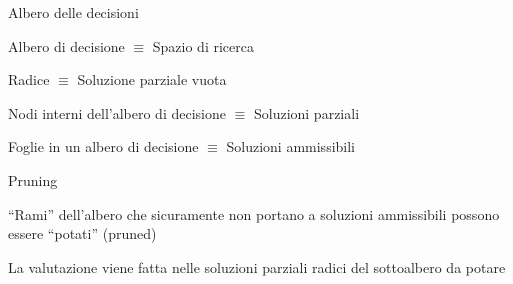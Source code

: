 \begin{frame}{Albero delle decisioni}

\BI
\item \alert{Albero di decisione} $\equiv$ Spazio di ricerca
\item \alert{Radice} $\equiv$ Soluzione parziale vuota
\item \alert{Nodi interni dell'albero di decisione} $\equiv$ Soluzioni parziali  
\item \alert{Foglie in un albero di decisione} $\equiv$ Soluzioni ammissibili 
\EI

\medskip
\begin{overprint}
\centerline{}
\centerline{}
\centerline{}
\centerline{}
\centerline{}
\centerline{}
\centerline{}
\centerline{}
\centerline{}
\centerline{}
\end{overprint}

\end{frame}

\begin{frame}{Pruning}

\BI
\item “Rami” dell'albero che sicuramente non portano a soluzioni ammissibili possono essere “\alert{potati}”  (\alert{pruned})
\item La valutazione viene fatta nelle soluzioni parziali radici del sottoalbero da potare
\EI

\begin{overprint}
\centerline{}
\centerline{}
\end{overprint}

\end{frame}

